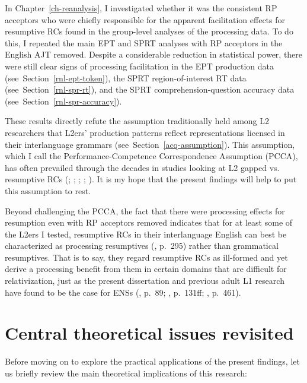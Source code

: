 In Chapter~\ref{ch-reanalysis}, I investigated whether it was the consistent RP acceptors who were chiefly responsible for the apparent facilitation effects for resumptive RCs found in the group-level analyses of the processing data. To do this, I repeated the main EPT and SPRT analyses with RP acceptors in the English AJT removed. Despite a considerable reduction in statistical power, there were still clear signs of processing facilitation in the EPT production data (see~Section~\ref{rnl-ept-token}), the SPRT region-of-interest RT data (see~Section~\ref{rnl-spr-rt}), and the SPRT comprehension-question accuracy data (see~Section~\ref{rnl-spr-accuracy}). 

These results directly refute the assumption traditionally held among L2 researchers that L2ers' production patterns reflect representations licensed in their interlanguage grammars (see~Section~\ref{acq-assumption}). This assumption, which I call the Performance-Competence Correspondence Assumption (PCCA), has often prevailed through the decades in studies looking at L2 gapped vs. resumptive RCs (\cite{algady2013}; \cite{gass1979}; \cite{hyltenstam1984}; \cite{marefat.abdollahnejad2014}; \cite{pavesi1986}). It is my hope that the present findings will help to put this assumption to rest.

Beyond challenging the PCCA, the fact that there were processing effects for resumption even with RP acceptors removed indicates that for at least some of the L2ers I tested, resumptive RCs in their interlanguage English can best be characterized as processing resumptives (\cite{asudeh2004}, p.~295) rather than grammatical resumptives. That is to say, they regard resumptive RCs as ill-formed and yet derive a processing benefit from them in certain domains that are difficult for relativization, just as the present dissertation and previous adult L1 research have found to be the case for ENSs (\cite{chacon2015}, p.~89; \cite{kroch1981}, p.~131ff; \cite{sells1984}, p.~461).

\section{Central theoretical issues revisited}\label{dis-implication}

Before moving on to explore the practical applications of the present findings, let us briefly review the main theoretical implications of this research:

